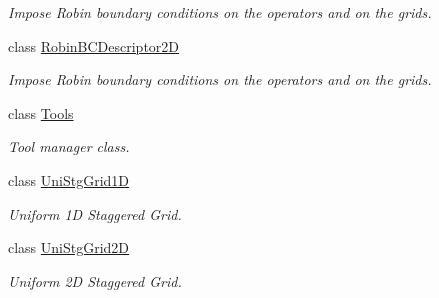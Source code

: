 \begin{DoxyCompactItemize}
\begin{DoxyCompactList}\small\item\em Impose Robin boundary conditions on the operators and on the grids. \end{DoxyCompactList}\item 
class \hyperlink{classmtk_1_1RobinBCDescriptor2D}{Robin\+B\+C\+Descriptor2\+D}
\begin{DoxyCompactList}\small\item\em Impose Robin boundary conditions on the operators and on the grids. \end{DoxyCompactList}\item 
class \hyperlink{classmtk_1_1Tools}{Tools}
\begin{DoxyCompactList}\small\item\em Tool manager class. \end{DoxyCompactList}\item 
class \hyperlink{classmtk_1_1UniStgGrid1D}{Uni\+Stg\+Grid1\+D}
\begin{DoxyCompactList}\small\item\em Uniform 1\+D Staggered Grid. \end{DoxyCompactList}\item 
class \hyperlink{classmtk_1_1UniStgGrid2D}{Uni\+Stg\+Grid2\+D}
\begin{DoxyCompactList}\small\item\em Uniform 2\+D Staggered Grid. \end{DoxyCompactList}\end{DoxyCompactItemize}
